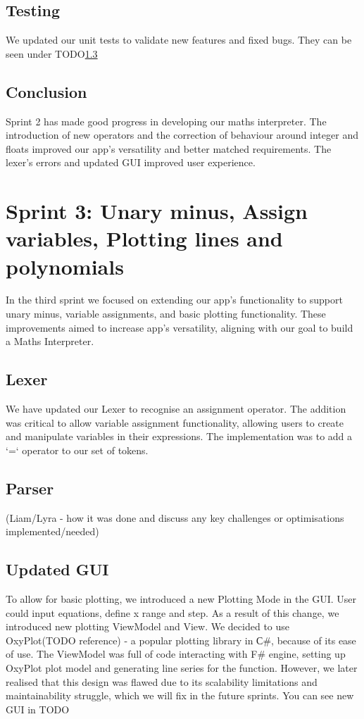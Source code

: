 \documentclass[a4paper, oneside, 11pt]{report}
\begin{document}
\subsection{Testing}
We updated our unit tests to validate new features and fixed bugs. They can be seen under TODO\ref{}

\subsection{Conclusion}
Sprint 2 has made good progress in developing our maths interpreter. The introduction of new operators and the correction of behaviour around integer and floats improved our app's versatility and better matched requirements. The lexer's errors and updated GUI improved user experience.


\section{Sprint 3: Unary minus, Assign variables, Plotting lines and polynomials}
In the third sprint we focused on extending our app’s functionality to support unary minus, variable assignments, and basic plotting functionality. These improvements aimed to increase app’s versatility, aligning with our goal to build a Maths Interpreter.

\subsection{Lexer}
We have updated our Lexer to recognise an assignment operator. The addition was critical to allow variable assignment functionality, allowing users to create and manipulate variables in their expressions. The implementation was to add a ‘=‘ operator to our set of tokens.

\subsection{Parser}
(Liam/Lyra - how it was done and discuss any key challenges or optimisations implemented/needed)

\subsection{Updated GUI}
To allow for basic plotting, we introduced a new Plotting Mode in the GUI. User could input equations, define x range and step. As a result of this change, we introduced new plotting ViewModel and View. We decided to use OxyPlot(TODO reference) - a popular plotting library in С#, because of its ease of use. The ViewModel was full of code interacting with F# engine, setting up OxyPlot plot model and generating line series for the function. However, we later realised that this design was flawed due to its scalability limitations and maintainability struggle, which we will fix in the future sprints. You can see new GUI in TODO
\end{document}
